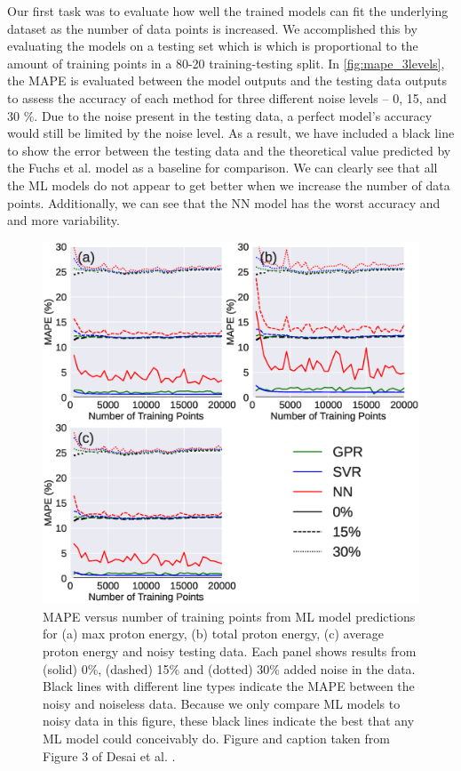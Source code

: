 Our first task was to evaluate how well the trained models can fit the underlying dataset as the number of data points is increased. We accomplished this by evaluating the models on a testing set which is which is proportional to the amount of training points in a 80-20 training-testing split. In \autoref{fig:mape_3levels}, the \gls{MAPE} is evaluated between the model outputs and the testing data outputs to assess the accuracy of each method for three different noise levels -- 0, 15, and 30 \%. Due to the noise present in the testing data, a perfect model's accuracy would still be limited by the noise level. As a result, we have included a black line to show the error between the testing data and the theoretical value predicted by the Fuchs et al. model as a baseline for comparison. We can clearly see that all the \gls{ML} models do not appear to get better when we increase the number of data points.  Additionally, we can see that the \gls{NN} model has the worst accuracy and and more variability.

\begin{figure}
	\centering 
	\includegraphics[width=0.75\linewidth]{planning/images/paper1/test_mape_3levels.eps}
	\caption{MAPE versus number of training points from ML model predictions for (a) max proton energy, (b) total proton energy, (c) average proton energy and noisy testing data. Each panel shows results from (solid) 0\%, (dashed) 15\% and (dotted) 30\% added noise in the data. Black lines with different line types indicate the MAPE between the noisy and noiseless data. Because we only compare ML models to noisy data in this figure, these black lines indicate the best that any ML model could conceivably do. Figure and caption taken from Figure 3 of Desai et al. \cite{Desai_2024_CPP}.}
	\label{fig:mape_3levels}
\end{figure}

